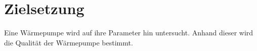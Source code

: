 
\section{Zielsetzung}
\label{sec:Zielsetzung}
Eine Wärmepumpe wird auf ihre Parameter hin untersucht. Anhand dieser wird die
Qualität der Wärmepumpe bestimmt.
